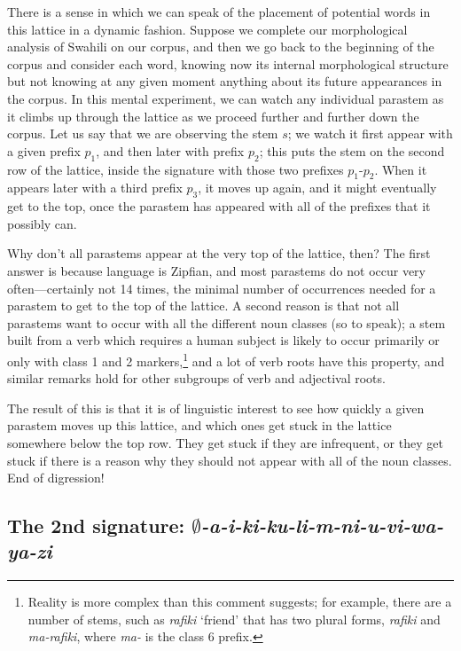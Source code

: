 \documentclass[output=paper,colorlinks,citecolor=brown,
]{langscibook}
\begin{document}
There is a sense in which we can speak of the placement of potential words in this lattice in a dynamic fashion. Suppose we complete our morphological analysis of Swahili on our corpus, and then we go back to the beginning of the corpus and consider each word, knowing now its internal morphological structure but not knowing at any given moment anything about its future appearances in the corpus. In this mental experiment, we can watch any individual parastem as it climbs up through the lattice as we proceed further and further down the corpus. Let us say that we are observing the stem $s$; we watch it first appear with a given prefix $p_1$, and then later with prefix $p_2$; this puts the stem on the second row of the lattice, inside the signature with those two prefixes $p_1$-$p_2$. When it appears later with a third prefix $p_3$, it moves up again, and it might eventually get to the top, once the parastem has appeared with all of the prefixes that it possibly can. 

Why don't all parastems appear at the very top of the lattice, then? The first answer is because language is Zipfian, and most parastems do not occur very often---certainly not 14 times, the minimal number of occurrences needed for a parastem to get to the top of the lattice. A second reason is that not all parastems want to occur with all the different noun classes (so to speak); a stem built from a verb which requires a human subject is likely to occur primarily or only with class 1 and 2 markers,\footnote{Reality is more complex than this comment suggests; for example, there are a number of stems, such as \textit{rafiki} `friend' that has two plural forms, \textit{rafiki} and \textit{ma-rafiki}, where \textit{ma-} is the class 6 prefix.} and a lot of verb roots have this property, and similar remarks hold for other subgroups of verb and adjectival roots. 

The result of this is that it is of linguistic interest to see how quickly a given parastem moves up this lattice, and which ones get stuck in the lattice somewhere below the top row. They get stuck if they are infrequent, or they get stuck if there is a reason why they should not appear with all of the noun classes. End of digression!

\subsection{The 2nd signature: \textit{$\emptyset$-a-i-ki-ku-li-m-ni-u-vi-wa-ya-zi} }
 
\end{document}
